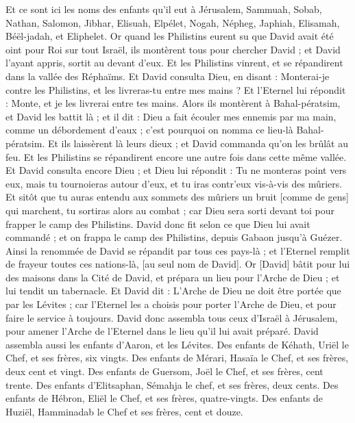 \begin{multicols}{2}
Et ce sont ici les noms des enfants qu'il eut à Jérusalem, Sammuah, Sobab, Nathan, Salomon,
Jibhar, Elisuah, Elpélet,
Nogah, Népheg, Japhiah,
Elisamah, Béël-jadah, et Eliphelet.
Or quand les Philistins eurent su que David avait été oint pour Roi sur tout Israël, ils montèrent tous pour chercher David ; et David l'ayant appris, sortit au devant d'eux.
Et les Philistins vinrent, et se répandirent dans la vallée des Réphaïms.
Et David consulta Dieu, en disant : Monterai-je contre les Philistins, et les livreras-tu entre mes mains ? Et l'Eternel lui répondit : Monte, et je les livrerai entre tes mains.
Alors ils montèrent à Bahal-pératsim, et David les battit là ; et il dit : Dieu a fait écouler mes ennemis par ma main, comme un débordement d'eaux ; c'est pourquoi on nomma ce lieu-là Bahal-pératsim.
Et ils laissèrent là leurs dieux ; et David commanda qu'on les brûlât au feu.
Et les Philistins se répandirent encore une autre fois dans cette même vallée.
Et David consulta encore Dieu ; et Dieu lui répondit : Tu ne monteras point vers eux, mais tu tournoieras autour d'eux, et tu iras contr'eux vis-à-vis des mûriers.
Et sitôt que tu auras entendu aux sommets des mûriers un bruit [comme de gens] qui marchent, tu sortiras alors au combat ; car Dieu sera sorti devant toi pour frapper le camp des Philistins.
David donc fit selon ce que Dieu lui avait commandé ; et on frappa le camp des Philistins, depuis Gabaon jusqu'à Guézer.
Ainsi la renommée de David se répandit par tous ces pays-là ; et l'Eternel remplit de frayeur toutes ces nations-là, [au seul nom de David].
\VerseOne{}Or [David] bâtit pour lui des maisons dans la Cité de David, et prépara un lieu pour l'Arche de Dieu ; et lui tendit un tabernacle.
Et David dit : L'Arche de Dieu ne doit être portée que par les Lévites ; car l'Eternel les a choisis pour porter l'Arche de Dieu, et pour faire le service à toujours.
David donc assembla tous ceux d'Israël à Jérusalem, pour amener l'Arche de l'Eternel dans le lieu qu'il lui avait préparé.
David assembla aussi les enfants d'Aaron, et les Lévites.
Des enfants de Kéhath, Uriël le Chef, et ses frères, six vingts.
Des enfants de Mérari, Hasaïa le Chef, et ses frères, deux cent et vingt.
Des enfants de Guersom, Joël le Chef, et ses frères, cent trente.
Des enfants d'Elitsaphan, Sémahja le chef, et ses frères, deux cents.
Des enfants de Hébron, Eliël le Chef, et ses frères, quatre-vingts.
Des enfants de Huziël, Hamminadab le Chef et ses frères, cent et douze.

\end{multicols}
